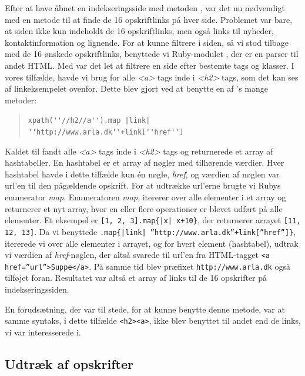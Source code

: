 Efter at have åbnet en indekseringsside med metoden , var det nu nødvendigt med en metode til at finde de 16 opskriftlinks på hver side. Problemet var bare, at siden ikke kun indeholdt de 16 opskriftlinks, men også links til nyheder, kontaktinformation og lignende. For at kunne filtrere i siden, så vi stod tilbage med de 16 ønskede opskriftlinks, benyttede vi Ruby-modulet \cite{rubygemnokogiri}, der er en parser til andet HTML. Med  var det let at filtrere en side efter bestemte tags og klasser. I vores tilfælde, havde vi brug for alle \textit{<a>} tags inde i \textit{<h2>} tags, som det kan ses af linkeksempelet ovenfor. Dette blev gjort ved at benytte en af 's mange metoder:

\begin{quote} 
 \lstinline{xpath(''//h2//a'').map |link| ''http://www.arla.dk''+link[''href'']}
\end{quote}

Kaldet til  fandt alle \textit{<a>} tags inde i \textit{<h2>} tags og returnerede et array af hashtabeller. En hashtabel er et array af nøgler med tilhørende værdier. Hver hashtabel havde i dette tilfælde kun én nøgle, \textit{href}, og værdien af nøglen var url'en til den pågældende opskrift. For at udtrække url'erne brugte vi Rubys enumerator \textit{map}. Enumeratoren \textit{map}, itererer over alle elementer i et array og returnerer et nyt array, hvor en eller flere operationer er blevet udført på alle elementer\cite{rubydoc}. Et eksempel er \texttt{[1, 2, 3].map\{|x| x+10\}}, der returnerer arrayet \texttt{[11, 12, 13]}. Da vi benyttede \texttt{.map\{|link| ''http://www.arla.dk''+link[''href'']\}}, itererede vi over alle elementer i arrayet, og for hvert element (hashtabel), udtrak vi værdien af \textit{href}-nøglen, der altså svarede til url'en fra HTML-tagget \texttt{<a href=''url''>Suppe</a>}. På samme tid blev præfixet \texttt{http://www.arla.dk} også tilføjet foran. Resultatet var altså et array af links til de 16 opskrifter på indekseringssiden.

En forudsætning, der var til stede, for at kunne benytte denne metode, var at samme syntaks, i dette tilfælde \lstinline{<h2><a>}, ikke blev benyttet til andet end de links, vi var interesserede i.


\subsection{Udtræk af opskrifter}

